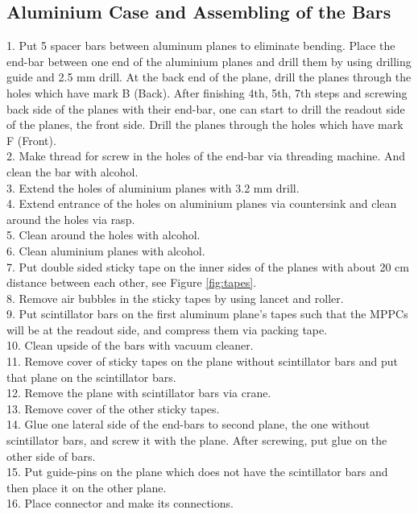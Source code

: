 \documentclass[a4paper]{article}\linespread{1.4}
\begin{document}
\subsection{Aluminium Case and Assembling of the Bars}
1.   Put 5 spacer bars between aluminum planes to eliminate bending. Place the end-bar between one end of the aluminium planes and drill them by using drilling guide and 2.5 mm drill.
At the back end of the plane, drill the planes through the holes which have mark B (Back).
After finishing 4th, 5th, 7th steps and screwing back side of the planes with their end-bar, one can start to drill the readout side of the planes, the front side. Drill the planes through the holes which have mark F (Front).
\\2.	Make thread for screw in the holes of the end-bar via threading machine. And clean the bar with alcohol.
\\3.	Extend the holes of aluminium planes with 3.2 mm drill.
\\4.	Extend entrance of the holes on aluminium planes via countersink and clean around the holes via rasp.
\\5.	Clean around the holes with alcohol.
\\6.	Clean aluminium planes with alcohol.
\\7.	Put double sided sticky tape on the inner sides of the planes with about 20 cm distance between each other, see Figure \ref{fig:tapes}.
\\8.	Remove air bubbles in the sticky tapes by using lancet and roller.
\\9.	 Put scintillator bars on the first aluminum plane's tapes such that the MPPCs will be at the readout side, and compress them via packing tape.
\\10.	Clean upside of the bars with vacuum cleaner.
\\11.	 Remove cover of sticky tapes on the plane without scintillator bars and put that plane on the scintillator bars.
\\12.	Remove the plane with scintillator bars via crane.
\\13.	 Remove cover of the other sticky tapes.
\\14.	Glue one lateral side of the end-bars to second plane, the one without scintillator bars, and screw it with the plane. After screwing, put glue on the other side of bars.
\\15.	Put guide-pins on the plane which does not have the scintillator bars and then place it on the other plane.
\\16.	Place connector and make its connections.
\end{document}
